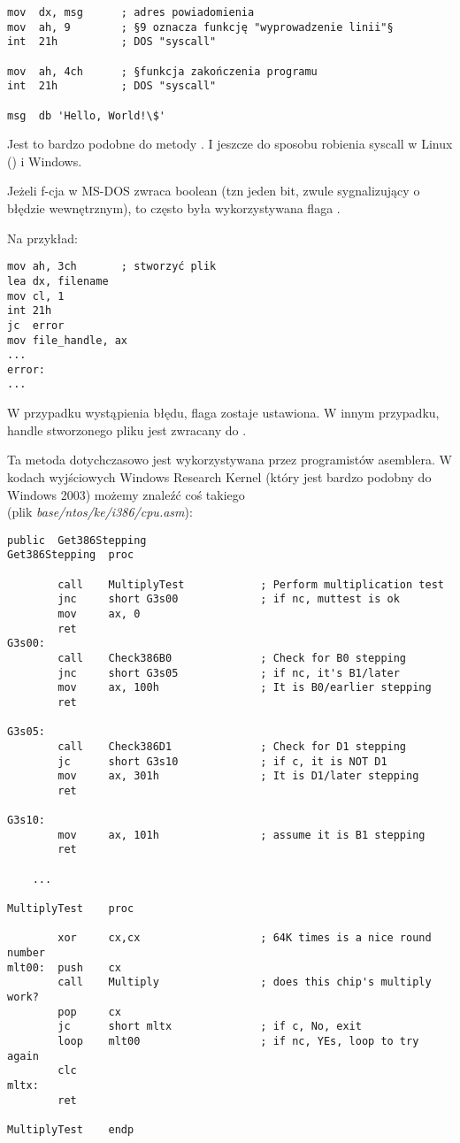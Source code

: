 \begin{lstlisting}[style=customasmx86]
mov  dx, msg      ; adres powiadomienia
mov  ah, 9        ; §9 oznacza funkcję "wyprowadzenie linii"§
int  21h          ; DOS "syscall"

mov  ah, 4ch      ; §funkcja zakończenia programu
int  21h          ; DOS "syscall"

msg  db 'Hello, World!\$'
\end{lstlisting}

Jest to bardzo podobne do metody .
I jeszcze do sposobu robienia syscall w Linux () i Windows.

Jeżeli f-cja w MS-DOS zwraca boolean (tzn jeden bit, zwule sygnalizujący o błędzie wewnętrznym),
to często była wykorzystywana flaga .

Na przykład:

\begin{lstlisting}[style=customasmx86]
mov ah, 3ch       ; stworzyć plik
lea dx, filename
mov cl, 1
int 21h
jc  error
mov file_handle, ax
...
error:
...
\end{lstlisting}

W przypadku wystąpienia błędu, flaga  zostaje ustawiona.
W innym przypadku, handle stworzonego pliku jest zwracany do .

Ta metoda dotychczasowo jest wykorzystywana przez programistów asemblera.
W kodach wyjściowych Windows Research Kernel (który jest bardzo podobny do Windows 2003) możemy znaleźć coś takiego\\
(plik \emph{base/ntos/ke/i386/cpu.asm}):

\begin{lstlisting}[style=customasmx86]
        public  Get386Stepping
Get386Stepping  proc

        call    MultiplyTest            ; Perform multiplication test
        jnc     short G3s00             ; if nc, muttest is ok
        mov     ax, 0
        ret
G3s00:
        call    Check386B0              ; Check for B0 stepping
        jnc     short G3s05             ; if nc, it's B1/later
        mov     ax, 100h                ; It is B0/earlier stepping
        ret

G3s05:
        call    Check386D1              ; Check for D1 stepping
        jc      short G3s10             ; if c, it is NOT D1
        mov     ax, 301h                ; It is D1/later stepping
        ret

G3s10:
        mov     ax, 101h                ; assume it is B1 stepping
        ret

	...

MultiplyTest    proc

        xor     cx,cx                   ; 64K times is a nice round number
mlt00:  push    cx
        call    Multiply                ; does this chip's multiply work?
        pop     cx
        jc      short mltx              ; if c, No, exit
        loop    mlt00                   ; if nc, YEs, loop to try again
        clc
mltx:
        ret

MultiplyTest    endp
\end{lstlisting}



